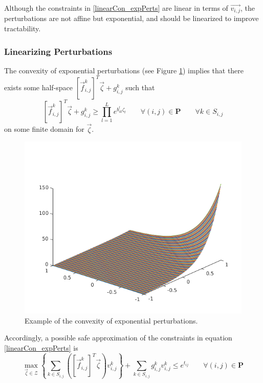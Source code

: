 Although the constraints in \eqref{linearCon_expPerts} are linear in terms of $\vec{v_{i,j}}$, the perturbations are not affine but exponential, and should be linearized to improve tractability.
 
\subsubsection{Linearizing Perturbations}
The convexity of exponential perturbations (see Figure \ref{perts_convexity}) implies that there exists some half-space $[\vec{f}_{i,j}^k]^T\vec{\zeta} + g_{i,j}^k$ such that 
$$[\vec{f}_{i,j}^k]^T\vec{\zeta} + g_{i,j}^k \geq \textstyle{\prod}_{l=1}^{L}e^{b^l_{ik}\zeta_l} \qquad \forall (i, j) \in \mathbf{P} \qquad \forall k \in S_{i,j}$$
on some finite domain for $\vec{\zeta}$.

\begin{figure}[H]
\captionsetup{justification=centering, font=small}
\begin{center}
\includegraphics[scale=0.7]{convex.png}
\end{center}
\caption{Example of the convexity of exponential perturbations.}
\label{perts_convexity}
\end{figure}
 
Accordingly, a possible safe approximation of the constraints in equation \eqref{linearCon_expPerts} is
\begin{equation}
\max_{\vec{\zeta} \in \mathcal{Z}} \left\{\textstyle{\sum}_{k \in S_{i,j}}\left([\vec{f}_{i,j}^k]^T\vec{\zeta}\right)v_{i,j}^k \right\} + \textstyle{\sum}_{k \in S_{i,j}}g_{i,j}^k v_{i,j}^k \leq e^{t_{ij}} \qquad \forall (i, j) \in \mathbf{P}
\label{linearCon_linPerts}
\end{equation}

